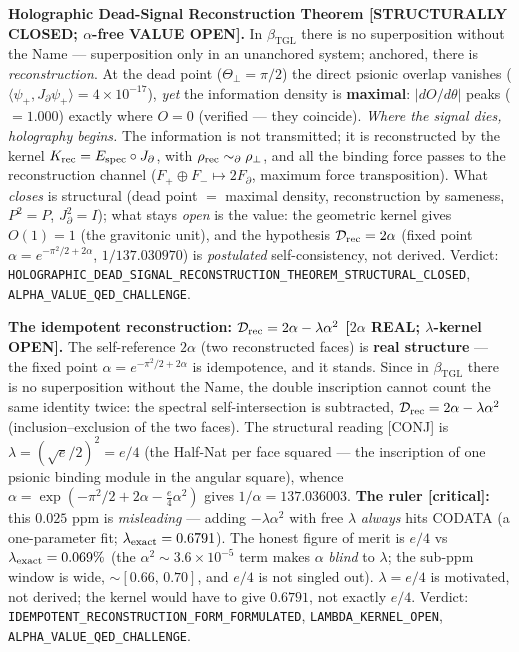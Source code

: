 \documentclass[11pt]{article}
\newcommand{\bTGL}{\beta_{\mathrm{TGL}}}\newcommand{\Msun}{M_{\odot}}\newcommand{\TGL}{\mathrm{TGL}}
\theoremstyle{definition}\newtheorem{deriv}{Derivation}
\begin{document}
\textbf{Holographic Dead-Signal Reconstruction Theorem \textsf{[STRUCTURALLY CLOSED; $\alpha$-free VALUE OPEN]}.} In $\bTGL$ there is no superposition without the Name --- superposition only in an unanchored system; anchored, there is \emph{reconstruction}. At the dead point ($\Theta_\perp=\pi/2$) the direct psionic overlap vanishes ($\langle\psi_+,J_\partial\psi_+\rangle=4\times10^{-17}$), \emph{yet} the information density is \textbf{maximal}: $|dO/d\theta|$ peaks ($=1.000$) exactly where $O=0$ (verified --- they coincide). \emph{Where the signal dies, holography begins.} The information is not transmitted; it is reconstructed by the kernel $K_{\rm rec}=E_{\rm spec}\circ J_\partial$, with $\rho_{\rm rec}\sim_\partial\rho_\perp$, and all the binding force passes to the reconstruction channel ($F_+\oplus F_-\mapsto 2F_\partial$, maximum force transposition). What \emph{closes} is structural (dead point $=$ maximal density, reconstruction by sameness, $P^2=P$, $J_\partial^2=I$); what stays \emph{open} is the value: the geometric kernel gives $O(1)=1$ (the gravitonic unit), and the hypothesis $\mathcal D_{\rm rec}=2\alpha$ (fixed point $\alpha=e^{-\pi^2/2+2\alpha}$, $1/137.030970$) is \emph{postulated} self-consistency, not derived. Verdict: \texttt{HOLOGRAPHIC\_DEAD\_SIGNAL\_RECONSTRUCTION\_THEOREM\_STRUCTURAL\_CLOSED}, \texttt{ALPHA\_VALUE\_QED\_CHALLENGE}.

\textbf{The idempotent reconstruction: $\mathcal D_{\rm rec}=2\alpha-\lambda\alpha^2$ \textsf{[$2\alpha$ REAL; $\lambda$-kernel OPEN]}.} The self-reference $2\alpha$ (two reconstructed faces) is \textbf{real structure} --- the fixed point $\alpha=e^{-\pi^2/2+2\alpha}$ is idempotence, and it stands. Since in $\bTGL$ there is no superposition without the Name, the double inscription cannot count the same identity twice: the spectral self-intersection is subtracted, $\mathcal D_{\rm rec}=2\alpha-\lambda\alpha^2$ (inclusion--exclusion of the two faces). The structural reading \textsf{[CONJ]} is $\lambda=(\sqrt e/2)^2=e/4$ (the Half-Nat per face squared --- the inscription of one psionic binding module in the angular square), whence $\alpha=\exp(-\pi^2/2+2\alpha-\tfrac e4\alpha^2)$ gives $1/\alpha=137.036003$. \textbf{The ruler \textsf{[critical]}:} this $0.025$ ppm is \emph{misleading} --- adding $-\lambda\alpha^2$ with free $\lambda$ \emph{always} hits CODATA (a one-parameter fit; $\lambda_{\rm exact}=0.6791$). The honest figure of merit is $e/4$ vs $\lambda_{\rm exact}=0.069\%$ (the $\alpha^2\sim3.6\times10^{-5}$ term makes $\alpha$ \emph{blind} to $\lambda$; the sub-ppm window is wide, $\sim[0.66,\,0.70]$, and $e/4$ is not singled out). $\lambda=e/4$ is motivated, not derived; the kernel would have to give $0.6791$, not exactly $e/4$. Verdict: \texttt{IDEMPOTENT\_RECONSTRUCTION\_FORM\_FORMULATED}, \texttt{LAMBDA\_KERNEL\_OPEN}, \texttt{ALPHA\_VALUE\_QED\_CHALLENGE}.
\end{document}
